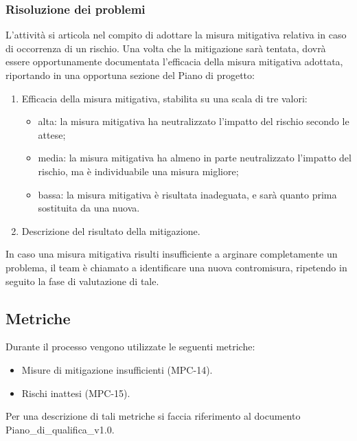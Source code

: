 \subsubsection{Risoluzione dei problemi}
L'attività si articola nel compito di adottare la misura mitigativa relativa in caso di occorrenza di un rischio. Una volta che la mitigazione sarà tentata, dovrà essere opportunamente documentata l'efficacia della misura mitigativa adottata, riportando in una opportuna sezione del Piano di progetto:
\begin{enumerate}
    \item Efficacia della misura mitigativa, stabilita su una scala di tre valori:
    \begin{itemize}
        \item alta: la misura mitigativa ha neutralizzato l'impatto del rischio secondo le attese;
        \item media: la misura mitigativa ha almeno in parte neutralizzato l'impatto del rischio, ma è individuabile una misura migliore;
        \item bassa: la misura mitigativa è risultata inadeguata, e sarà quanto prima sostituita da una nuova.
    \end{itemize}
    \item Descrizione del risultato della mitigazione.
\end{enumerate}
In caso una misura mitigativa risulti insufficiente a arginare completamente un problema, il team è chiamato a identificare una nuova contromisura, ripetendo in seguito la fase di valutazione di tale.
\subsection{Metriche}
Durante il processo vengono utilizzate le seguenti metriche:
\begin{itemize}
    \item Misure di mitigazione insufficienti (MPC-14).
    \item Rischi inattesi (MPC-15).
\end{itemize}
Per una descrizione di tali metriche si faccia riferimento al documento Piano\_di\_qualifica\_v1.0.

